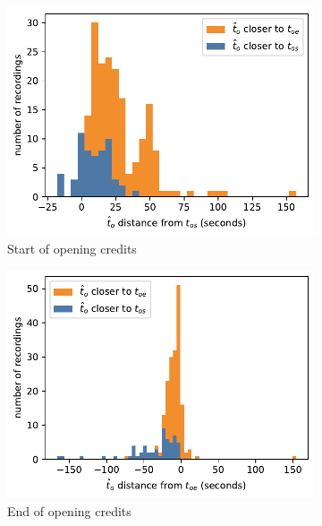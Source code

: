 \begin{figure}[H]
    \begin{subfigure}[t]{.49\textwidth}
      \centering
      \includegraphics[width=\linewidth]{../plots/distances/pelt_l2_dist_start_first.pdf}
      \caption{Start of opening credits}
      \label{fig:t_diff_os}
    \end{subfigure}
    \hfill
    \begin{subfigure}[t]{.49\textwidth}
      \centering
      \includegraphics[width=\linewidth]{../plots/distances/pelt_l2_dist_start_last.pdf}
      \caption{End of opening credits}
      \label{fig:t_diff_oe}
    \end{subfigure}
    \begin{subfigure}[t]{.49\textwidth}

\end{subfigure}
\end{figure}
